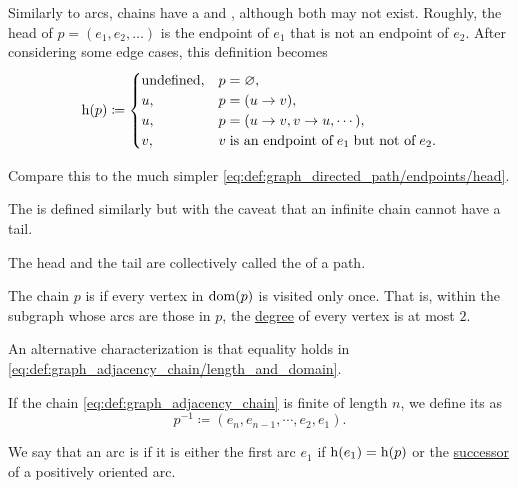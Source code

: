 \begin{definition}
\begin{thmenum}
     Similarly to arcs, chains have a  and , although both may not exist. Roughly, the head of \( p = (e_1, e_2, \ldots) \) is the endpoint of \( e_1 \) that is not an endpoint of \( e_2 \). After considering some edge cases, this definition becomes
    \begin{equation}\label{eq:def:graph_adjacency_chain/endpoints/head}
      \head(p) \coloneqq \begin{cases}
        \T{undefined}, &p = \varnothing, \\
        u,             &p = (u \to v), \\
        u,             &p = (u \to v, v \to u, \cdots), \\
        v,             &v \T{is an endpoint of} e_1 \T{but not of} e_2.
      \end{cases}
    \end{equation}

    Compare this to the much simpler \eqref{eq:def:graph_directed_path/endpoints/head}.

    The  is defined similarly but with the caveat that an infinite chain cannot have a tail.

    The head and the tail are collectively called the  of a path.

     The chain \( p \) is  if every vertex in \( \operatorname{dom}(p) \) is visited only once. That is, within the subgraph whose arcs are those in \( p \), the \hyperref[def:graph_incidence/degree]{degree} of every vertex is at most \( 2 \).

    An alternative characterization is that equality holds in \eqref{eq:def:graph_adjacency_chain/length_and_domain}.

     If the chain \eqref{eq:def:graph_adjacency_chain} is finite of length \( n \), we define its  as
    \begin{equation*}
      p^{-1} \coloneqq (e_n, e_{n-1}, \cdots, e_2, e_1).
    \end{equation*}

     We say that an arc is  if it is either the first arc \( e_1 \) if \( \operatorname{h}(e_1) = \operatorname{h}(p) \) or the \hyperref[def:graph/adjacency]{successor} of a positively oriented arc.


\end{thmenum}
\end{definition}
